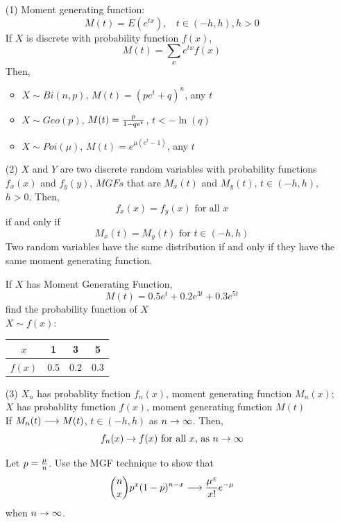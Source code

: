 \documentclass[english, 11pt]{article}
\begin{document}
  \begin{itemize}
    \item[(1)] Moment generating function:
    \[ M(t) = E(e^{tx}), \ \ \ \ t \in (-h,h), h > 0 \]
    If $X$ is discrete with probability function $f(x)$,
    \[ M(t) = \sum_x e^{tx}f(x) \]
    Then,
    \begin{itemize}
      \item $X \sim Bi(n,p)$, $M(t) = (pe^t + q)^n$, any $t$
      \item $X \sim Geo(p)$, $M(t) = \frac{p}{1-qe^t}$, $t < -\ln(q)$
      \item $X \sim Poi(\mu)$, $M(t) = e^{\mu(e^t - 1)}$, any $t$
    \end{itemize}

    \item[(2)] $X$ and $Y$ are two discrete random variables with probability functions $f_x(x)$ and $f_y(y)$, $MGFs$ that are $M_x(t)$ and $M_y(t)$, $t \in (-h,h)$, $h>0$. Then,
    \[ f_x(x) = f_y(x) \mbox{ \ \ for all $x$} \]
    if and only if
    \[ M_x(t) = M_y(t) \mbox{ \ \ for $t \in (-h,h)$} \]
    Two random variables have the same distribution if and only if they have the same moment generating function.

    \begin{exmp}
      If $X$ has Moment Generating Function,
      \[ M(t) = 0.5e^t + 0.2e^{3t} + 0.3e^{5t} \]
      find the probability function of $X$ \\

      $X \sim f(x):$
      \begin{tabular}{c | c c c}
        $x$ & 1 & 3 & 5 \\
        \hline
        $f(x)$ & 0.5 & 0.2 & 0.3
      \end{tabular}

    \end{exmp}

    \item[(3)] $X_n$ has probablity fnction $f_n(x)$, moment generating function $M_n(x)$; \\
    $X$ has probablity function $f(x)$, moment generating function $M(t)$ \\

    If $M_n(t) \longrightarrow M(t)$, $t \in (-h,h)$ as $n \rightarrow \infty$. Then,
    \[ f_n(x) \rightarrow f(x) \mbox{\ for all $x$, as $n \rightarrow \infty$} \]

    \begin{exmp}
      Let $p = \frac{\mu}{n}$. Use the MGF technique to show that
      \[ {n \choose x}p^x(1-p)^{n-x} \longrightarrow \frac{\mu^x}{x!}e^{-\mu} \]
      when $n \rightarrow \infty$. \\


\end{exmp}
\end{itemize}
\end{document}
